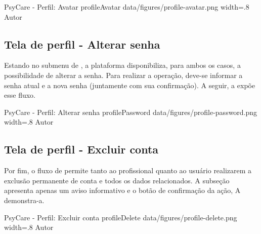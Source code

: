 \image
    {PsyCare - Perfil: Avatar}
    {profileAvatar}
    {data/figures/profile-avatar.png}
    {width=.8\textwidth}
    {Autor}

\subsection{Tela de perfil - Alterar senha}
\label{sec:perfilAvatar}
Estando no submenu de , a plataforma disponibiliza, para ambos os casos, a possibilidade de alterar a senha. Para realizar a operação, deve-se informar a senha atual e a nova senha (juntamente com sua confirmação). A seguir, a  expõe esse fluxo.

\image
    {PsyCare - Perfil: Alterar senha}
    {profilePassword}
    {data/figures/profile-password.png}
    {width=.8\textwidth}
    {Autor}

\subsection{Tela de perfil - Excluir conta}
\label{sec:perfilExcluir}
Por fim, o fluxo de  permite tanto ao profissional quanto ao usuário realizarem a exclusão permanente de conta e todos os dados relacionados. A subseção apresenta apenas um aviso informativo e o botão de confirmação da ação, A  demonstra-a.

\image
    {PsyCare - Perfil: Excluir conta}
    {profileDelete}
    {data/figures/profile-delete.png}
    {width=.8\textwidth}
    {Autor}